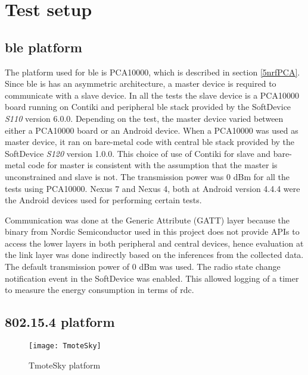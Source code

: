 
\section{Test setup} \label{6TestPlatforms}

\subsection{\gls{ble} platform}
The platform used for \gls{ble} is PCA10000, which is described in section \ref{5nrfPCA}. Since \gls{ble}  is has an asymmetric architecture, a master device is required to communicate with a slave device. In all the tests the slave device is a PCA10000 board running on Contiki and peripheral \gls{ble}  stack provided by the SoftDevice \emph{S110} version 6.0.0. Depending on the test, the master device varied between either a PCA10000 board or an Android device. When a PCA10000 was used as master device, it ran on bare-metal code with central \gls{ble} stack provided by the SoftDevice \emph{S120} version 1.0.0. This choice of use of Contiki for slave and bare-metal code for master is consistent with the assumption that the master is unconstrained and slave is not. The transmission power was 0 dBm for all the tests using PCA10000. Nexus 7 and Nexus 4, both at Android version 4.4.4 were the Android devices used for performing certain tests.

Communication was done at the Generic Attribute (GATT) layer because the binary from Nordic Semiconductor used in this project does not provide APIs to access the lower layers in both peripheral and central devices, hence evaluation at the link layer was done indirectly based on the inferences from the collected data. The default transmission power of 0 dBm was used. The radio state change notification event in the SoftDevice was enabled. This allowed logging of a timer to measure the energy consumption in terms of \gls{rdc}.

\subsection{802.15.4 platform}

\begin{figure}[h]
    \centering
    \texttt{[image: TmoteSky]}
	\caption{TmoteSky platform}
    \label{fig:TmoteSky}
\end{figure}


